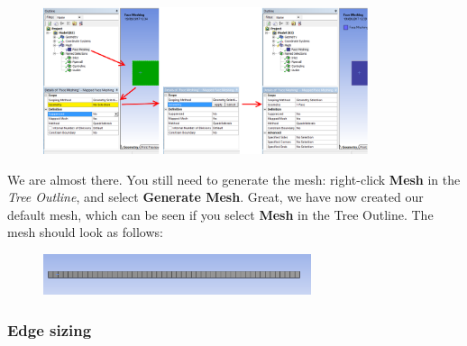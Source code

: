 \documentclass[11pt,a4paper,oneside,hidelinks]{scrartcl}
\newcommand\bfr[1]{\textcolor[rgb]{1,0.00,0.00}{\textbf{\textsf{#1}}}}
\begin{document}
\begin{figure}[H]
\begin{center}
\includegraphics[width=0.85\textwidth,clip]{apply_mfm.png}
\end{center}
\end{figure}
We are almost there. You still need to generate the mesh:  right-click \bfr{Mesh} in the \emph{Tree Outline}, and select \bfr{Generate Mesh}. Great, we have now created our default mesh, which can be seen if you select \bfr{Mesh} in the Tree Outline. The mesh should look as follows:
\begin{figure}[H]
\begin{center}
\includegraphics[width=0.7\textwidth,clip]{default_mesh.png}
\end{center}
\end{figure}


\subsubsection{Edge sizing}
\end{document}

